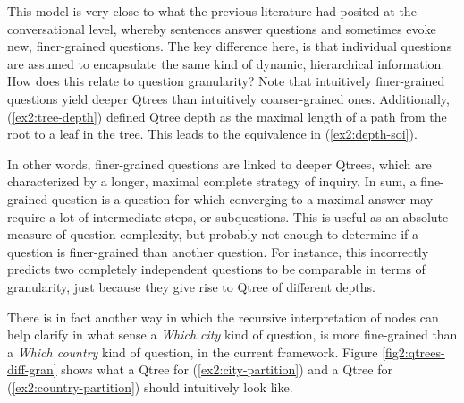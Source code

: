 This model is very close to what the previous literature had posited at the conversational level, whereby sentences answer questions and sometimes evoke new, finer-grained questions. The key difference here, is that individual questions are assumed to encapsulate the same kind of dynamic, hierarchical information. How does this relate to question granularity? Note that intuitively finer-grained questions yield deeper Qtrees than intuitively coarser-grained ones. Additionally, (\ref{ex2:tree-depth}) defined Qtree depth as the maximal length of a path from the root to a leaf in the tree. This leads to the equivalence in (\ref{ex2:depth-soi}).

\begin{exe}
	\label{ex2:depth-soi}
\end{exe}

In other words, finer-grained questions are linked to deeper Qtrees, which are characterized by a longer, maximal complete strategy of inquiry. In sum, a fine-grained question is a question for which converging to a maximal answer may require a lot of intermediate steps, or subquestions. This is useful as an absolute measure of question-complexity, but probably not enough to determine if a question is finer-grained than another question. For instance, this incorrectly predicts two completely independent questions to be comparable in terms of granularity, just because they give rise to Qtree of different depths. 



There is in fact another way in which the recursive interpretation of nodes can help clarify in what sense a \textit{Which city} kind of question, is more fine-grained than a \textit{Which country} kind of question, in the current framework. Figure \ref{fig2:qtrees-diff-gran} shows what a Qtree for (\ref{ex2:city-partition}) and a Qtree for (\ref{ex2:country-partition}) should intuitively look like. 

